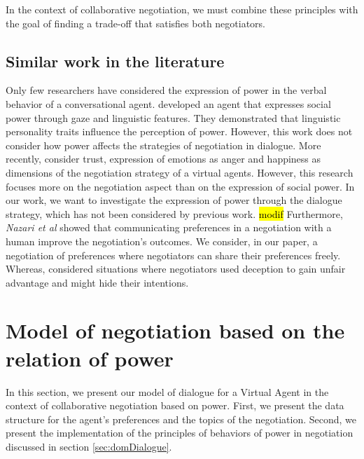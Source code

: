 \documentclass{llncs}
\begin{document}
		In the context of collaborative negotiation, we must combine these principles with the goal of finding a trade-off that satisfies both negotiators.

		
		\subsection{Similar work in the literature}
		Only few researchers have considered the expression of power in the verbal behavior of a conversational agent. \cite{bee2010bossy} developed an agent that expresses social power through gaze and linguistic features. They demonstrated that linguistic personality traits influence the perception of power. However, this work does not consider how power affects the strategies of negotiation in dialogue. More recently, \cite{broekens2010affective,de2015humans} consider trust, expression of emotions as anger and happiness as dimensions of the negotiation strategy of a virtual agents. However, this research focuses more on the negotiation aspect than on the expression of social power. In our work, we want to investigate the expression of power through the dialogue strategy, which has not been considered by previous work.
		\hl{ modif }
		Furthermore, \textit{Nazari et al}\cite{nazari2015opponent} showed  that communicating preferences in a negotiation with a human improve the negotiation's outcomes. We consider, in our paper, a negotiation of preferences where negotiators can share their preferences freely. Whereas, \cite{nazari2015opponent} considered situations where negotiators used deception to gain unfair advantage and might hide their intentions.
		
		\section{Model of negotiation based on the relation of power}
		In this section, we present our model of dialogue for a Virtual Agent  in the context of collaborative negotiation based on power.	
		First, we present the data structure for the agent's preferences and the topics of the negotiation. Second, we present the implementation of the principles of behaviors of power in negotiation discussed in section \ref{sec:domDialogue}.
		\vspace{-1em} 
\end{document}
